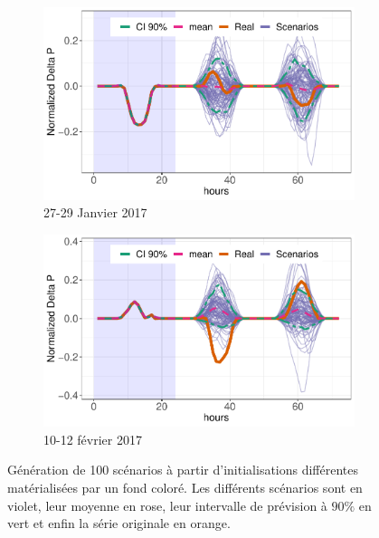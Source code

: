 \documentclass[12pt, french]{report}
\begin{document}
\begin{figure}[htbp]
\begin{center}
		\begin{subfigure}[b]{0.5\linewidth}
			\centering
			\includegraphics[width = 0.95 \linewidth]{Images/PV/HMM/id27.pdf}
			\caption{27-29 Janvier 2017}
		\end{subfigure}%
		\begin{subfigure}[b]{0.5\linewidth}
			\centering
			\includegraphics[width = 0.95 \linewidth]{Images/PV/HMM/id41.pdf}
			\caption{10-12 février 2017}
		\end{subfigure}
	\end{center}
	
	\caption{Génération de 100 scénarios à partir d'initialisations différentes matérialisées par un fond coloré. Les différents scénarios sont en violet, leur moyenne en rose, leur intervalle de prévision à $90\%$ en vert et enfin la série originale en orange.}
	\label{fig:PV_HMM_Scenarios} 
\end{figure}
\end{document}
